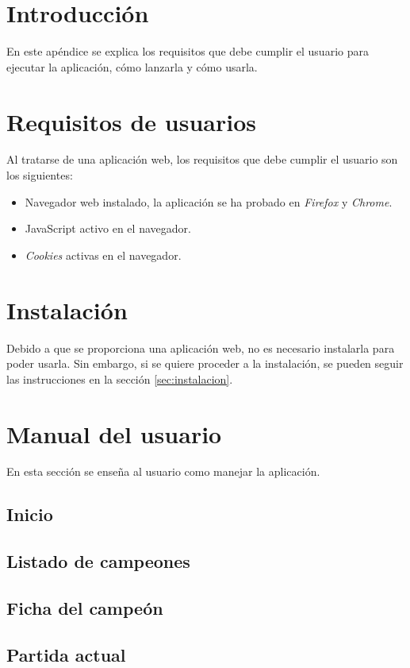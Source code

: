 
\section{Introducción}
En este apéndice se explica los requisitos que debe cumplir el usuario para ejecutar la aplicación, cómo lanzarla y cómo usarla.

\section{Requisitos de usuarios}
Al tratarse de una aplicación web, los requisitos que debe cumplir el usuario son los siguientes:

\begin{itemize}
	\tightlist
	\item Navegador web instalado, la aplicación se ha probado en \textit{Firefox} y \textit{Chrome}.
	\item JavaScript activo en el navegador.
	\item \textit{Cookies} activas en el navegador.
\end{itemize}


\section{Instalación}
Debido a que se proporciona una aplicación web, no es necesario instalarla para poder usarla. Sin embargo, si se quiere proceder a la instalación, se pueden seguir las instrucciones en la sección \ref{sec:instalacion}.


\section{Manual del usuario}
En esta sección se enseña al usuario como manejar la aplicación.

\subsection{Inicio}


\subsection{Listado de campeones}

\subsection{Ficha del campeón}

\subsection{Partida actual}